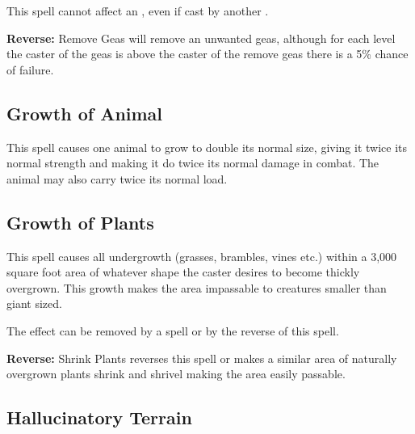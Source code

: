 \begin{multicols*}{2}
This spell cannot affect an , even if cast by another .

\textbf{Reverse:} \hypertarget{spell:Remove Geas}{Remove Geas} will remove an unwanted geas, although for each level the caster of the geas is above the caster of the remove geas there is a 5\% chance of failure.

\subsection{Growth of Animal}\label{spell:Growth of Animal}

This spell causes one animal to grow to double its normal size, giving it twice its normal strength and making it do twice its normal damage in combat. The animal may also carry twice its normal load.

\subsection{Growth of Plants}\label{spell:Growth of Plants}

This spell causes all undergrowth (grasses, brambles, vines etc.) within a 3,000 square foot area of whatever shape the caster desires to become thickly overgrown. This growth makes the area impassable to creatures smaller than giant sized.

The effect can be removed by a  spell or by the reverse of this spell.

\textbf{Reverse:} \hypertarget{spell:Shrink Plants}{Shrink Plants} reverses this spell or makes a similar area of naturally overgrown plants shrink and shrivel making the area easily passable.

\subsection{Hallucinatory Terrain}\label{spell:Hallucinatory Terrain}
\end{multicols*}
